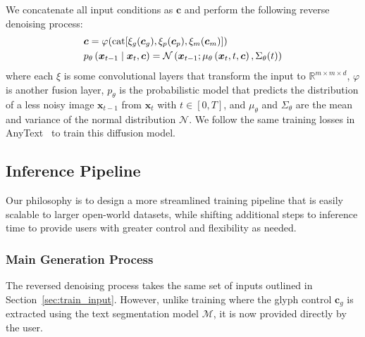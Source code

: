 We concatenate all input conditions as $\boldsymbol{c}$ and perform the following reverse denoising process:
\begin{align}
    & \boldsymbol{c} = \varphi(\operatorname{cat}[\xi_g(\boldsymbol{c}_{g}), \xi_p(\boldsymbol{c}_{p}), \xi_m(\boldsymbol{c}_{m})]) \label{eqn:condition} \\
    & p_\theta\left(\boldsymbol{x}_{t-1} \mid \boldsymbol{x}_t, \boldsymbol{c}\right)=\mathcal{N}\left(\boldsymbol{x}_{t-1} ; \mu_\theta\left(\boldsymbol{x}_t, t, \boldsymbol{c}\right), \Sigma_\theta(t)\right)\label{eqn:denoise}\vspace{-5mm}
\end{align}
where each $\xi$ is some convolutional layers that transform the input to $\mathbb{R}^{m \times m \times d}$, $\varphi$ is another fusion layer,
$p_\theta$ is the probabilistic model that predicts the distribution of a less noisy image $\boldsymbol{x}_{t-1}$ from $\boldsymbol{x}_{t}$ with $t \in [0, T]$,
and $\mu_\theta$ and $\Sigma_\theta$ are the mean and variance of the normal distribution $\mathcal{N}$. We follow the same training losses in AnyText~\cite{tuo2023anytext} to train this diffusion model.



\subsection{Inference Pipeline}
Our philosophy is to design a more streamlined training pipeline that is easily scalable to larger open-world datasets, while shifting additional steps to inference time to provide users with greater control and flexibility as needed.

\subsubsection{Main Generation Process}
The reversed denoising process takes the same set of inputs outlined in Section~\ref{sec:train_input}. However, unlike training where the glyph control $\boldsymbol{c}_g$ is extracted using the text segmentation model $\mathcal{M}$, it is now provided directly by the user. 

